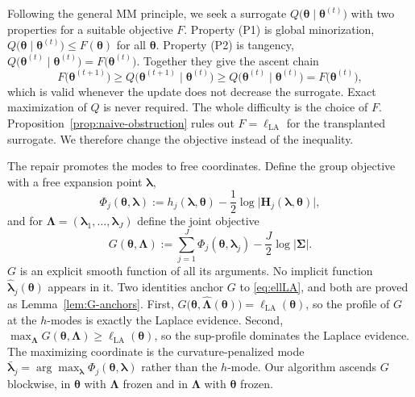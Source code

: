 Following the general MM principle, we seek a surrogate $Q\big(\bm{\theta}\mid\bm{\theta}^{(t)}\big)$ with two properties for a suitable objective $F$. Property (P1) is global minorization, $Q\big(\bm{\theta}\mid\bm{\theta}^{(t)}\big)\leq F(\bm{\theta})$ for all $\bm{\theta}$. Property (P2) is tangency, $Q\big(\bm{\theta}^{(t)}\mid\bm{\theta}^{(t)}\big)=F\big(\bm{\theta}^{(t)}\big)$. Together they give the ascent chain
\begin{equation}
    F\big(\bm{\theta}^{(t+1)}\big)\geq Q\big(\bm{\theta}^{(t+1)}\mid\bm{\theta}^{(t)}\big)\geq Q\big(\bm{\theta}^{(t)}\mid\bm{\theta}^{(t)}\big)=F\big(\bm{\theta}^{(t)}\big),
    \label{eq:mm-ascent-chain}
\end{equation}
which is valid whenever the update does not decrease the surrogate. Exact maximization of $Q$ is never required. The whole difficulty is the choice of $F$. Proposition~\ref{prop:naive-obstruction} rules out $F=\ell_{\text{LA}}$ for the transplanted surrogate. We therefore change the objective instead of the inequality.
 
The repair promotes the modes to free coordinates. Define the group objective with a free expansion point $\bm{\lambda}$,
\begin{equation}
    \Phi_{j}(\bm{\theta},\bm{\lambda}):=h_{j}(\bm{\lambda},\bm{\theta})-\frac{1}{2}\log\big|\mathbf{H}_{j}(\bm{\lambda},\bm{\theta})\big|,
    \label{eq:Phi-def}
\end{equation}
and for $\bm{\Lambda}=(\bm{\lambda}_{1},\dots,\bm{\lambda}_{J})$ define the joint objective
\begin{equation}
    G(\bm{\theta},\bm{\Lambda}):=\sum_{j=1}^{J}\Phi_{j}(\bm{\theta},\bm{\lambda}_{j})-\frac{J}{2}\log|\bm{\Sigma}|.
    \label{eq:G-def}
\end{equation}
$G$ is an explicit smooth function of all its arguments. No implicit function $\hat{\bm{\lambda}}_{j}(\bm{\theta})$ appears in it. Two identities anchor $G$ to \eqref{eq:ellLA}, and both are proved as Lemma~\ref{lem:G-anchors}. First, $G\big(\bm{\theta},\hat{\bm{\Lambda}}(\bm{\theta})\big)=\ell_{\text{LA}}(\bm{\theta})$, so the profile of $G$ at the $h$-modes is exactly the Laplace evidence. Second, $\max_{\bm{\Lambda}}G(\bm{\theta},\bm{\Lambda})\geq\ell_{\text{LA}}(\bm{\theta})$, so the sup-profile dominates the Laplace evidence. The maximizing coordinate is the curvature-penalized mode $\bar{\bm{\lambda}}_{j}=\arg\max_{\bm{\lambda}}\Phi_{j}(\bm{\theta},\bm{\lambda})$ rather than the $h$-mode. Our algorithm ascends $G$ blockwise, in $\bm{\theta}$ with $\bm{\Lambda}$ frozen and in $\bm{\Lambda}$ with $\bm{\theta}$ frozen.
 
